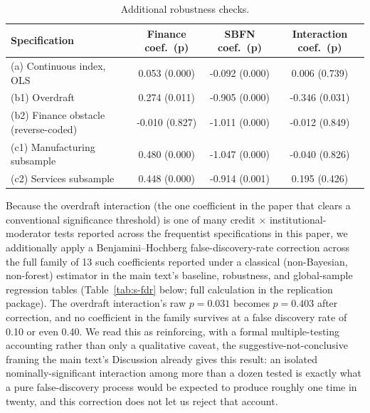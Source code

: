 \documentclass[12pt]{article}
\begin{document}
\begin{table}[htbp]
\centering
\caption{Additional robustness checks.}
\label{tab:s-robustness}
\begin{footnotesize}
\begin{tabular}{lccc}
\toprule
Specification & Finance coef.\ (p) & SBFN coef.\ (p) & Interaction coef.\ (p) \\
\midrule
(a) Continuous index, OLS & 0.053 (0.000) & -0.092 (0.000) & 0.006 (0.739) \\
(b1) Overdraft & 0.274 (0.011) & -0.905 (0.000) & -0.346 (0.031) \\
(b2) Finance obstacle (reverse-coded) & -0.010 (0.827) & -1.011 (0.000) & -0.012 (0.849) \\
(c1) Manufacturing subsample & 0.480 (0.000) & -1.047 (0.000) & -0.040 (0.826) \\
(c2) Services subsample & 0.448 (0.000) & -0.914 (0.001) & 0.195 (0.426) \\
\bottomrule
\end{tabular}
\end{footnotesize}
\end{table}

Because the overdraft interaction (the one coefficient in the paper that clears a conventional
significance threshold) is one of many credit $\times$ institutional-moderator tests reported across
the frequentist specifications in this paper, we additionally apply a Benjamini--Hochberg
false-discovery-rate correction across the full family of 13 such coefficients reported under a
classical (non-Bayesian, non-forest) estimator in the main text's baseline, robustness, and
global-sample regression tables (Table~\ref{tab:s-fdr} below; full calculation in the replication
package). The overdraft interaction's raw $p=0.031$ becomes $p=0.403$ after correction, and no
coefficient in the family survives at a false discovery rate of 0.10 or even 0.40. We read this as
reinforcing, with a formal multiple-testing accounting rather than only a qualitative caveat, the
suggestive-not-conclusive framing the main text's Discussion already gives this result: an isolated
nominally-significant interaction among more than a dozen tested is exactly what a pure
false-discovery process would be expected to produce roughly one time in twenty, and this correction
does not let us reject that account.
\end{document}
